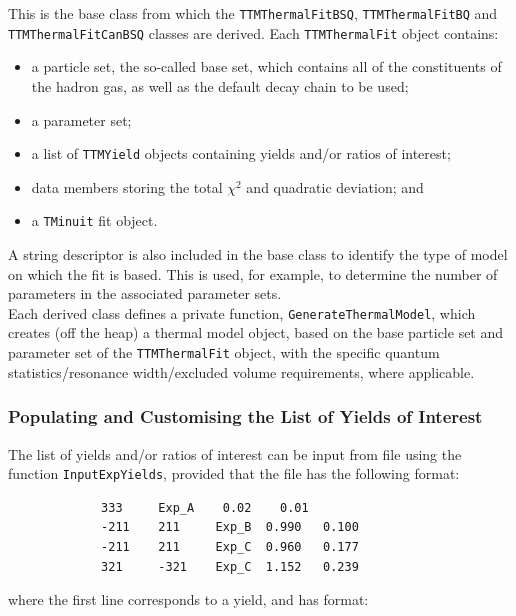 \documentclass{elsarticle}
\begin{document}
This is the base class from which the \texttt{TTMThermalFitBSQ}, \texttt{TTMThermalFitBQ} and \texttt{TTMThermalFitCanBSQ} classes are derived. Each \texttt{TTMThermalFit} object contains:
\begin{itemize}
\item{a particle set, the so-called base set, which contains all of the constituents of the hadron gas, as 
well as the default decay chain to be used;} 
\item{a parameter set;} 
\item{a list of \texttt{TTMYield} objects containing yields and/or ratios of interest;}
\item{data members storing the total $\chi^2$ and quadratic deviation; and} 
\item{a \texttt{TMinuit} fit object.}
\end{itemize}

A string descriptor is also included in the base class to 
identify the type of model on which the fit is based. This is used, for 
example, to determine the number of parameters in the associated 
parameter sets.\\ 

Each derived class defines a private function, \texttt{GenerateThermalModel}, which creates 
(off the heap) a thermal model object, based on the base particle set and parameter set of 
the \texttt{TTMThermalFit} object, with the specific quantum statistics/resonance width/excluded 
volume requirements, where applicable.\\

\subsubsection{Populating and Customising the List of Yields of Interest}
The list of yields and/or ratios of interest can be input from file using 
the function 
\texttt{InputExpYields}, provided that the file has the following format:

\small
\begin{verbatim}
             333     Exp_A    0.02    0.01
             -211    211     Exp_B  0.990   0.100
             -211    211     Exp_C  0.960   0.177
             321     -321    Exp_C  1.152   0.239
\end{verbatim}
\normalsize

\noindent
where the first line corresponds to a yield, and has format:\\
\end{document}
